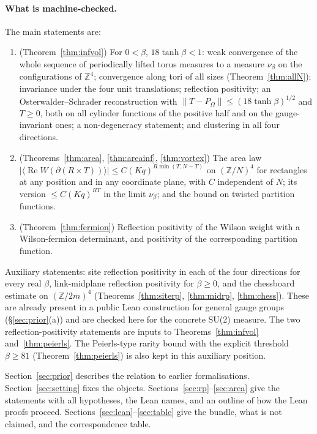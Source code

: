 \documentclass[11pt,a4paper]{article}
\theoremstyle{definition}
\theoremstyle{remark}
\newcommand{\Z}{\mathbb{Z}}
\renewcommand{\Re}{\operatorname{Re}}
\begin{document}
\paragraph{What is machine-checked.} The main statements are:
\begin{enumerate}[leftmargin=1.8em]
\item (Theorem~\ref{thm:infvol}) For $0<\beta$, $18\tanh\beta<1$: weak convergence of the whole sequence of periodically lifted torus measures to a measure $\nu_\beta$ on the configurations of $\Z^4$; convergence along tori of all sizes (Theorem~\ref{thm:allN}); invariance under the four unit translations; reflection positivity; an Osterwalder--Schrader reconstruction with $\|T-P_\Omega\|\le(18\tanh\beta)^{1/2}$ and $T\ge0$, both on all cylinder functions of the positive half and on the gauge-invariant ones; a non-degeneracy statement; and clustering in all four directions.
\item (Theorems~\ref{thm:area}, \ref{thm:areainf}, \ref{thm:vortex}) The area law $|\langle\Re W(\partial(R\times T))\rangle|\le C(Kq)^{R\min(T,N-T)}$ on $(\Z/N)^4$ for rectangles at any position and in any coordinate plane, with $C$ independent of $N$; its version $\le C(Kq)^{RT}$ in the limit $\nu_\beta$; and the bound on twisted partition functions.
\item (Theorem~\ref{thm:fermion}) Reflection positivity of the Wilson weight with a Wilson-fermion determinant, and positivity of the corresponding partition function.
\end{enumerate}
Auxiliary statements: site reflection positivity in each of the four directions for every real $\beta$, link-midplane reflection positivity for $\beta\ge0$, and the chessboard estimate on $(\Z/2m)^4$ (Theorems~\ref{thm:siterp}, \ref{thm:midrp}, \ref{thm:chess}). These are already present in a public Lean construction for general gauge groups (\S\ref{sec:prior}(a)) and are checked here for the concrete SU(2) measure. The two reflection-positivity statements are inputs to Theorems~\ref{thm:infvol} and~\ref{thm:peierls}. The Peierls-type rarity bound with the explicit threshold $\beta\ge81$ (Theorem~\ref{thm:peierls}) is also kept in this auxiliary position.

Section~\ref{sec:prior} describes the relation to earlier formalisations. Section~\ref{sec:setting} fixes the objects. Sections~\ref{sec:rp}--\ref{sec:area} give the statements with all hypotheses, the Lean names, and an outline of how the Lean proofs proceed. Sections~\ref{sec:lean}--\ref{sec:table} give the bundle, what is not claimed, and the correspondence table.
\end{document}
